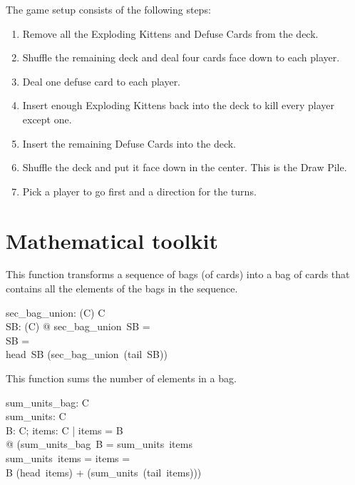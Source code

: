 \documentclass[11pt, fuzz]{article}
\begin{document}
The game setup consists of the following steps:

\begin{enumerate}
    \item Remove all the Exploding Kittens and Defuse Cards from the deck. 
    \item Shuffle the remaining deck and deal four cards face down to each player.
    \item Deal one defuse card to each player. 
    \item Insert enough Exploding Kittens back into the deck to kill every player except one. 
    \item Insert the remaining Defuse Cards into the deck. 
    \item Shuffle the deck and put it face down in the center. This is the Draw Pile. 
    \item Pick a player to go first and a direction for the turns. 
\end{enumerate}


\section{Mathematical toolkit}

This function transforms a sequence of bags (of cards) into a bag of cards that contains all the elements of the bags in the sequence. 

\begin{gendef}[C]
    sec\_bag\_union: \seq (\bag C) \fun \bag C\\
\where
    \forall SB: \seq (\bag C) @ sec\_bag\_union~SB = \\
    \IF SB = \emptyset \THEN \lbag~\rbag\\
    \ELSE head~SB \uplus (sec\_bag\_union~(tail~SB))
\end{gendef}

This function sums the number of elements in a bag. 

\begin{gendef}[C]
    sum\_units\_bag: \bag C \fun \nat\\
    sum\_units: \seq C \fun \nat\\
\where
    \forall B: \bag C; items: \seq C | \ran items = \dom B\\
    @ (sum\_units\_bag~B = sum\_units~items \land\\
    sum\_units~items = \IF items = \emptyset {}\\
    \ELSE B \bcount (head~items) + (sum\_units~(tail~items)))
\end{gendef}
\end{document}
